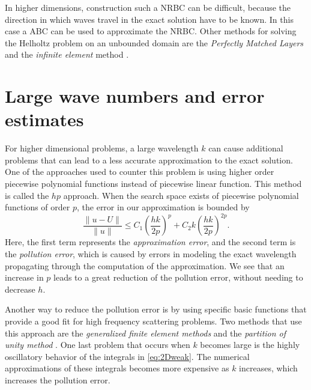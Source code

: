 \documentclass[a4paper]{article}
\begin{document}
In higher dimensions, construction such a NRBC can be difficult,
because the direction in which waves travel in the exact solution have
to be known. In this case a ABC can be used to approximate the NRBC.
Other methods for solving the Helholtz problem on an unbounded domain
are the \emph{Perfectly Matched Layers} and the
\emph{infinite element} method \cite[p.\ 20]{femnotes}.

\section{Large wave numbers and error estimates}

For higher dimensional problems, a large wavelength $k$ can cause
additional problems that can lead to a less accurate approximation to
the exact solution. One of the approaches used to counter this problem
is using higher order piecewise polynomial functions instead of
piecewise linear function. This method is called the $hp$ approach.
When the search space exists of piecewise polynomial functions of
order $p$, the error in our approximation is bounded by
\begin{equation*}
  \frac{\lVert u - U \rVert}{\lVert u \rVert}
  \leq C_1 \left( \frac{hk}{2p} \right)^p
  + C_2 k \left( \frac{hk}{2p} \right)^{2p}.
\end{equation*}
Here, the first term represents the \emph{approximation error}, and
the second term is the \emph{pollution error}, which is caused by
errors in modeling the exact wavelength propagating through the
computation of the approximation. We see that an increase in $p$ leads
to a great reduction of the pollution error, without needing to
decrease $h$.

Another way to reduce the pollution error is by using specific basic
functions that provide a good fit for high frequency scattering
problems. Two methods that use this approach are the \emph{generalized
finite element methods} and the \emph{partition of unity method}
\cite[p.\ 21]{femnotes}. One last problem that occurs when $k$ becomes large is the
highly oscillatory behavior of the integrals in \eqref{eq:2Dweak}.
The numerical approximations of these integrals becomes more expensive
as $k$ increases, which increases the pollution error.
\end{document}
